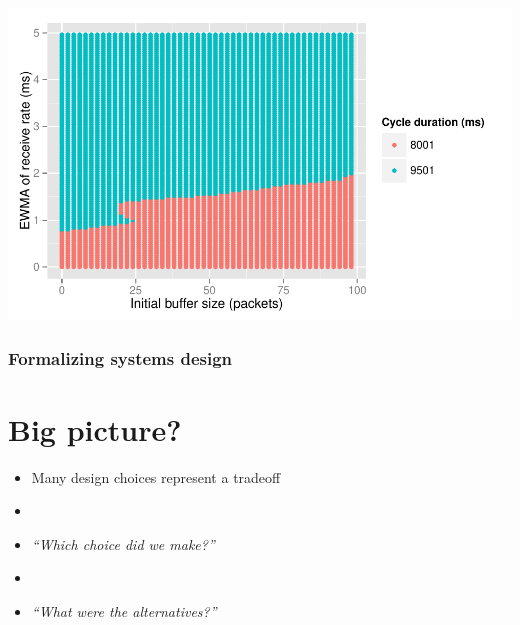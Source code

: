\documentclass[svgnames]{beamer}
\begin{document}

\begin{frame}

\includegraphics[width=\textwidth]{absolute-intersend-plot.pdf}

\end{frame}

\begin{frame}
\frametitle{Formalizing systems design}

\section{Big picture?}

\begin{itemize}
 
\item Many design choices represent a tradeoff

\item[]

\item \emph{``Which choice did we make?''}

\item[]

\item \emph{``What were the alternatives?''}

\end{itemize}
\end{frame}
\end{document}
